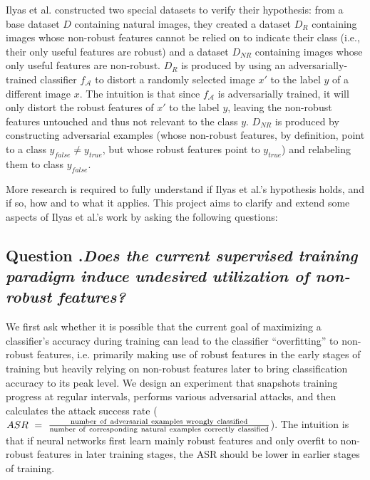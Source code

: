 Ilyas et al. constructed two special datasets to verify their hypothesis: from a base dataset $D$ containing natural images, they created a dataset $D_R$ containing images whose non-robust features cannot be relied on to indicate their class (i.e., their only useful features are robust) and a dataset $D_{NR}$ containing images whose only useful features are non-robust. $D_R$ is produced by using an adversarially-trained classifier $f_\mathcal{A}$ to distort a randomly selected image $x'$ to the label $y$ of a different image $x$. The intuition is that since $f_\mathcal{A}$ is adversarially trained, it will only distort the robust features of $x'$ to the label $y$, leaving the non-robust features untouched and thus not relevant to the class $y$. $D_{NR}$ is produced by constructing adversarial examples (whose non-robust features, by definition, point to a class $y_{false} \neq y_{true}$, but whose robust features point to $y_{true}$) and relabeling them to class $y_{false}$.

More research is required to fully understand if Ilyas et al.'s hypothesis holds, and if so, how and to what it applies. This project aims to clarify and extend some aspects of Ilyas et al.'s work by asking the following questions:

\subsection*{Question .\quad \rm{\textit{Does the current supervised training paradigm induce undesired utilization of non-robust features?}}} \label{q1}

We first ask whether it is possible that the current goal of maximizing a classifier's accuracy during training can lead to the classifier ``overfitting'' to non-robust features, i.e. primarily making use of robust features in the early stages of training but heavily relying on non-robust features later to bring classification accuracy to its peak level. We design an experiment that snapshots training progress at regular intervals, performs various adversarial attacks, and then calculates the attack success rate ($ASR~=~\frac{\rm{number~of~adversarial~examples~wrongly~classified}}{\rm{number~of~corresponding~natural~examples~correctly~classified}}$). The intuition is that if neural networks first learn mainly robust features and only overfit to non-robust features in later training stages, the ASR should be lower in earlier stages of training.

